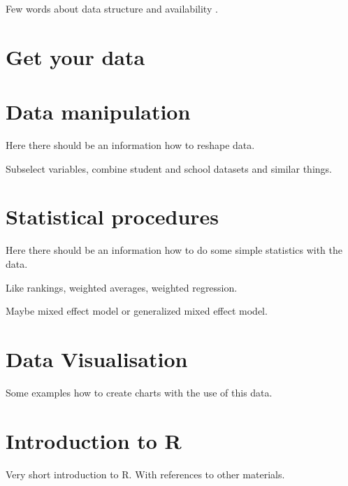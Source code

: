 \documentclass{tufte-book}
\begin{document}
Few words about data structure and availability \cite{PISAwebsite} \cite{OECDwebsite}.

\chapter{Get your data}


\chapter{Data manipulation}
Here there should be an information how to reshape data.

Subselect variables, combine student and school datasets and similar things.

\chapter{Statistical procedures}


Here there should be an information how to do some simple statistics with the data.

Like rankings, weighted averages, weighted regression.

Maybe mixed effect model or generalized mixed effect model.

\chapter{Data Visualisation}

Some examples how to create charts with the use of this data. 

\backmatter

\chapter{Introduction to R}
\label{sec:introToR}
Very short introduction to R. With references to other materials.




\printindex
\end{document}
